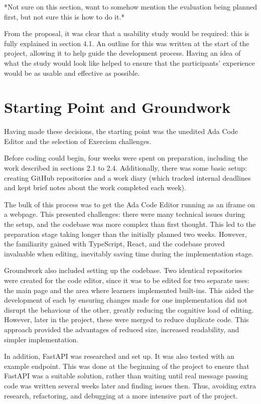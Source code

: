 *Not sure on this section, want to somehow mention the evaluation being planned first, but not sure this is how to do it.*

From the proposal, it was clear that a usability study would be required: this is fully explained in section 4.1. An outline for this was written at the start of the project, allowing it to help guide the development process. Having an idea of what the study would look like helped to ensure that the participants' experience would be as usable and effective as possible.

\section{Starting Point and Groundwork}

Having made these decisions, the starting point was the unedited Ada Code Editor and the selection of Exercism challenges.

Before coding could begin, four weeks were spent on preparation, including the work described in sections 2.1 to 2.4. Additionally, there was some basic setup: creating GitHub repositories and a work diary (which tracked internal deadlines and kept brief notes about the work completed each week).

The bulk of this process was to get the Ada Code Editor running as an iframe on a webpage. This presented challenges: there were many technical issues during the setup, and the codebase was more complex than first thought. This led to the preparation stage taking longer than the initially planned two weeks. However, the familiarity gained with TypeScript, React, and the codebase proved invaluable when editing, inevitably saving time during the implementation stage.

Groundwork also included setting up the codebase. Two identical repositories were created for the code editor, since it was to be edited for two separate uses: the main page and the area where learners implemented built-ins. This aided the development of each by ensuring changes made for one implementation did not disrupt the behaviour of the other, greatly reducing the cognitive load of editing. However, later in the project, these were merged to reduce duplicate code. This approach provided the advantages of reduced size, increased readability, and simpler implementation.

In addition, FastAPI was researched and set up. It was also tested with an example endpoint. This was done at the beginning of the project to ensure that FastAPI was a suitable solution, rather than waiting until real message passing code was written several weeks later and finding issues then. Thus, avoiding extra research, refactoring, and debugging at a more intensive part of the project.

